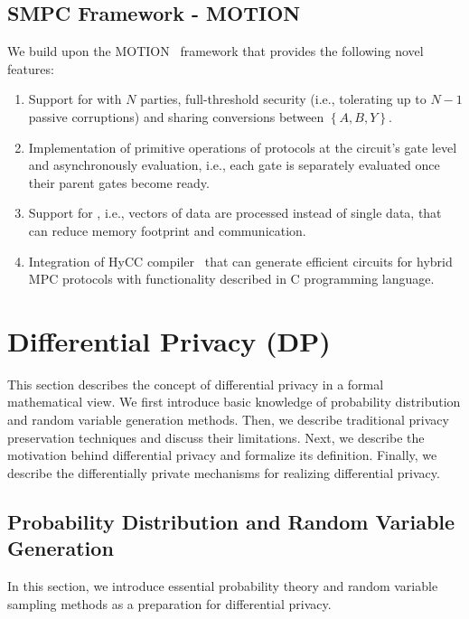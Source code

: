 \subsection{SMPC Framework - MOTION}
\label{subsection:MOTIONFramework}
We build upon the MOTION~\cite{braun2022motion} framework that provides the following novel features:
\begin{enumerate}
    \item Support for \smpc with $N$ parties, full-threshold security (i.e., tolerating up to $N-1$ passive corruptions) and sharing conversions between $\left\{A,B,Y\right\} $.
    \item Implementation of primitive operations of \smpc protocols at the circuit's gate level and asynchronously evaluation, i.e., each gate is separately evaluated once their parent gates become ready.
    \item Support for \simd, i.e., vectors of data are processed instead of single data, that can reduce memory footprint and communication.
    \item Integration of HyCC compiler~\cite{buscher2018hycc} that can generate efficient circuits for hybrid MPC protocols with functionality described in C programming language.
\end{enumerate}


\section{Differential Privacy (DP)}
\label{sec:differentialPrivacy}
This section describes the concept of differential privacy in a formal mathematical view. We first introduce basic knowledge of probability distribution and random variable generation methods. Then, we describe traditional privacy preservation techniques and discuss their limitations. Next, we describe the motivation behind differential privacy and formalize its definition. Finally, we describe the differentially private mechanisms for realizing differential privacy.

\subsection{Probability Distribution and Random Variable Generation}
\label{subsec:probabilityDistribution}
In this section, we introduce essential probability theory and random variable sampling methods as a preparation for differential privacy.

